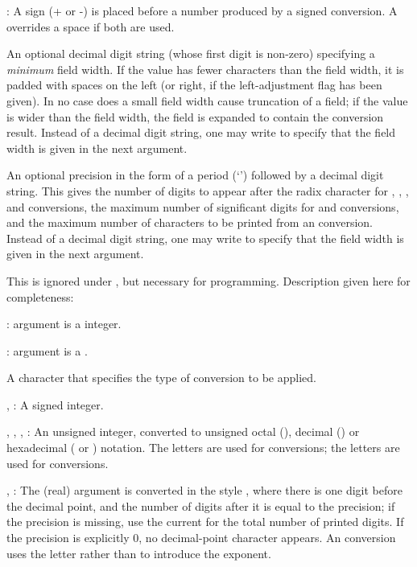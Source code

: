 \item \kbd{+}: A sign (+ or -) is placed before a number produced by a
signed conversion. A \kbd{+} overrides a space if both are used.

 An optional decimal digit string (whose first
digit is non-zero) specifying a \emph{minimum} field width. If the value has
fewer characters than the field width, it is padded with spaces on the left
(or right, if the left-adjustment flag has been given). In no case does a
small field width cause truncation of a field; if the value is wider than
the field width, the field is expanded to contain the conversion result.
Instead of a decimal digit string, one may write \kbd{*} to specify that the
field width is given in the next argument.

 An optional precision in the form of a period
(`') followed by a decimal digit string. This gives
the number of digits to appear after the radix character for ,
, , and  conversions, the maximum number of significant
digits for  and  conversions, and the maximum number of
characters to be printed from an  conversion.
Instead of a decimal digit string, one may write \kbd{*} to specify that the
field width is given in the next argument.

 This is ignored under , but
necessary for  programming. Description given here for
completeness:

\item {}: argument is a  integer.

\item {}: argument is a .

 A character that specifies the type of
conversion to be applied.

\item {}, : A signed integer.

\item {}, , , : An unsigned integer, converted
to unsigned octal (), decimal () or hexadecimal ( or
) notation. The letters  are used for 
conversions;  the letters  are used for  conversions.

\item {}, : The (real) argument is converted in the style
, where there is one digit before the decimal point,
and the number of digits after it is equal to the precision; if the
precision is missing, use the current  for the total
number of printed digits. If the precision is explicitly 0, no decimal-point
character appears. An  conversion uses the letter  rather
than  to introduce the exponent.

